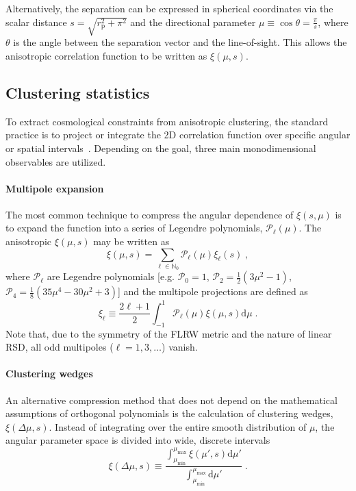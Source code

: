 \documentclass[12pt,a4paper,oneside]{report}
\begin{document}
Alternatively, the separation can be expressed in spherical coordinates via the scalar distance $s = \sqrt{r_\mathrm{p}^2 + \pi^2}$ and the directional parameter $\mu \equiv \cos\theta = \frac{\pi}{s}$, where $\theta$ is the angle between the separation vector and the line-of-sight. This allows the anisotropic correlation function to be written as $\xi(\mu, s)$.

\subsection{Clustering statistics}\label{subsec:ClusteringStatistics}
To extract cosmological constraints from anisotropic clustering, the standard practice is to project or integrate the 2D correlation function over specific angular or spatial intervals~\cite{Kazin}. Depending on the goal, three main monodimensional observables are utilized.

\paragraph{Multipole expansion}\label{parag:MultipoleExpansion}
The most common technique to compress the angular dependence of $\xi(s, \mu)$  is to expand the function into a series of Legendre polynomials, $\mathcal{P}_\ell(\mu)$. The anisotropic $\xi(\mu, s)$ may be written as
\begin{equation}
  \xi (\mu, s) = \sum_{\ell \in \mathbb{N}_0} \mathcal{P}_\ell (\mu) \xi_\ell(s) \; ,
  \label{eq:MultipoleExpansion}
\end{equation}
where $\mathcal{P}_\ell$ are Legendre polynomials [e.g. $\mathcal{P}_0 = 1$, $\mathcal{P}_2 = \frac{1}{2} (3\mu^2 -1)$, $\mathcal{P}_4 = \frac{1}{8} (35\mu^4 - 30\mu^2 + 3)$] and the multipole projections are defined as
\begin{equation}
  \xi_\ell \equiv \frac{2\ell + 1}{2} \int_{-1}^{1} \mathcal{P}_\ell (\mu) \xi(\mu,s) \mathrm{d}\mu \; .
  \label{eq:Multipoles}
\end{equation}
Note that, due to the symmetry of the FLRW metric and the nature of linear RSD, all odd multipoles ($\ell = 1, 3, \dots$) vanish.

\paragraph{Clustering wedges}\label{parag:ClusteringWedges}
An alternative compression method that does not depend on the mathematical assumptions of orthogonal polynomials is the calculation of clustering wedges, $\xi(\Delta\mu, s)$. Instead of integrating over the entire smooth distribution of $\mu$, the angular parameter space is divided into wide, discrete intervals
\begin{equation}
  \xi(\Delta\mu, s) \equiv \frac{\int_{\mu_\mathrm{min}}^{\mu_\mathrm{max}} \xi(\mu',s) \mathrm{d}\mu'}{\int_{\mu_\mathrm{min}}^{\mu_\mathrm{max}} \mathrm{d}\mu'} \; .
  \label{eq:ClusteringWedges}
\end{equation}
\end{document}
